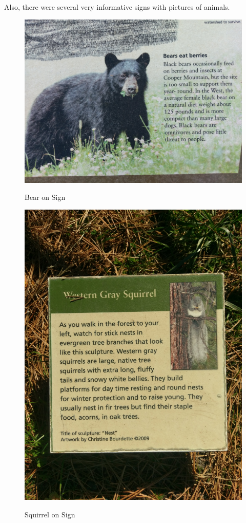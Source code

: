 \documentclass{article}
\begin{document}
Also, there were several very informative signs with pictures of animals.
\begin{figure}[H]
\centering{}
\caption{Bear on Sign}
\includegraphics[scale=0.06]{bears_eat_berries_sign.jpg}
\label{bear}
\end{figure}

\begin{figure}[H]
\centering{}
\caption{Squirrel on Sign}
\includegraphics[scale=0.06]{grey_squirrel_sign.jpg}
\label{squirrel}
\end{figure}
\newpage
\end{document}
